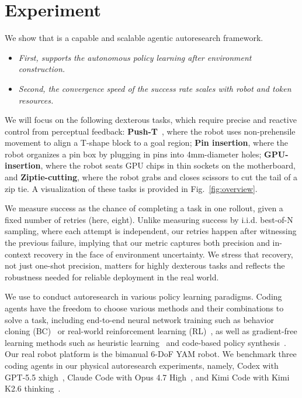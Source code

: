 \section{Experiment}
We show that \method is a capable and scalable agentic autoresearch framework. 
\begin{itemize}[leftmargin=*, topsep=2pt, itemsep=2pt, parsep=0pt, partopsep=0pt]
    \item \emph{First, \method supports the autonomous policy learning after environment construction. }
    \item \emph{Second, the convergence speed of the success rate \method scales with robot and token resources.}
\end{itemize}
We will focus on the following dexterous tasks, which require precise and reactive control from perceptual feedback: \textbf{Push-T}~\citep{chi2025diffusion}, where the robot uses non-prehensile movement to align a T-shape block to a goal region; \textbf{Pin insertion}, where the robot organizes a pin box by plugging in pins into 4mm-diameter holes; \textbf{GPU-insertion}, where the robot seats GPU chips in thin sockets on the motherboard, and \textbf{Ziptie-cutting}, where the robot grabs and closes scissors to cut the tail of a zip tie. A visualization of these tasks is provided in Fig.~\ref{fig:overview}.

We measure success as the chance of completing a task in one rollout, given a fixed number of retries (here, eight). Unlike measuring success by i.i.d. best-of-N sampling, where each attempt is independent, our retries happen after witnessing the previous failure, implying that our metric captures both precision and in-context recovery in the face of environment uncertainty. We stress that recovery, not just one-shot precision, matters for highly dexterous tasks and reflects the robustness needed for reliable deployment in the real world. 

We use \method to conduct autoresearch in various policy learning paradigms. Coding agents have the freedom to choose various methods and their combinations to solve a task, including end-to-end neural network training such as behavior cloning (BC)~\citep{bc} or real-world reinforcement learning (RL)~\citep{realrl-sac}, as well as gradient-free learning methods such as heuristic learning~\citep{weng2026heuristic} and code-based policy synthesis~\citep{cap}. Our real robot platform is the bimanual 6-DoF YAM robot. We benchmark three coding agents in our physical autoresearch experiments, namely, Codex with GPT-5.5 xhigh~\citep{openai2026codex}, Claude Code with Opus 4.7 High~\citep{anthropic2026claudeopus47}, and Kimi Code with Kimi K2.6 thinking~\citep{moonshot2026kimicode}. 


